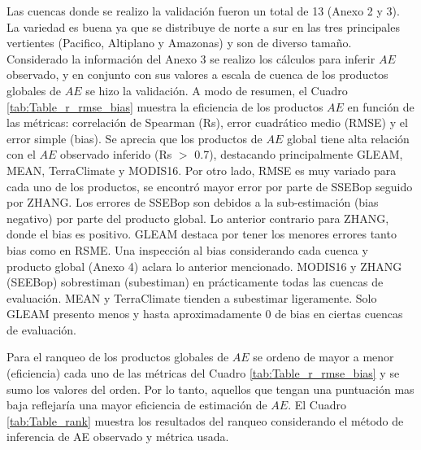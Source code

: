 \documentclass[12pt]{article}
\begin{document}
Las cuencas donde se realizo la validación fueron un total de 13 (Anexo 2 y 3). La variedad es buena ya que se distribuye de norte a sur en las tres principales vertientes (Pacifico, Altiplano y Amazonas) y son de diverso tamaño. Considerado la información del Anexo 3 se realizo los cálculos para inferir $AE$ observado, y en conjunto con sus valores a escala de cuenca de los productos globales de $AE$ se hizo la validación. A modo de resumen, el Cuadro \ref{tab:Table_r_rmse_bias} muestra la eficiencia de los productos $AE$ en función de las métricas: correlación de Spearman (Rs), error cuadrático medio (RMSE) y el error simple (bias). Se aprecia que los productos de $AE$ global tiene alta relación con el $AE$ observado inferido (Rs $>$ 0.7), destacando principalmente GLEAM, MEAN, TerraClimate y MODIS16. Por otro lado, RMSE es muy variado para cada uno de los productos, se encontró mayor error por parte de SSEBop seguido por ZHANG. Los errores de SSEBop son debidos a la sub-estimación (bias negativo) por parte del producto global. Lo anterior contrario para ZHANG, donde el bias es positivo. GLEAM destaca por tener los menores errores tanto bias como en RSME. Una inspección al bias considerando cada cuenca y producto global (Anexo 4) aclara lo anterior mencionado. MODIS16 y ZHANG (SEEBop) sobrestiman (subestiman) en prácticamente todas las cuencas de evaluación. MEAN y TerraClimate tienden a subestimar ligeramente. Solo GLEAM presento menos y hasta aproximadamente 0 de bias en ciertas cuencas de evaluación.



Para el ranqueo de los productos globales de $AE$ se ordeno de mayor a menor (eficiencia) cada uno de las métricas del Cuadro \ref{tab:Table_r_rmse_bias} y se sumo los valores del orden. Por lo tanto, aquellos que tengan una puntuación mas baja reflejaría una mayor eficiencia de estimación de $AE$. El Cuadro \ref{tab:Table_rank} muestra los resultados del ranqueo considerando el método de inferencia de AE observado y métrica usada. 


\end{document}
